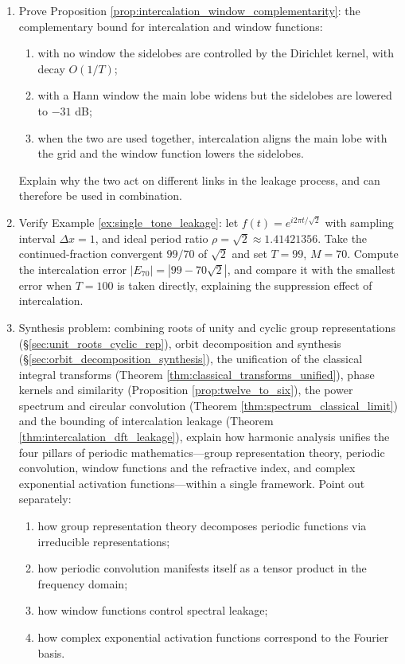 \begin{enumerate}[leftmargin=3em, label=\textbf{Exercise \arabic*}]
    \item Prove Proposition \ref{prop:intercalation_window_complementarity}:
    the complementary bound for intercalation and window functions:
    \begin{enumerate}[label=(\roman*)]
        \item with no window the sidelobes are controlled by the Dirichlet kernel, with decay $O(1/T)$;
        \item with a Hann window the main lobe widens but the sidelobes are lowered to $-31$ dB;
        \item when the two are used together, intercalation aligns the main lobe with the grid and the window function lowers the sidelobes.
    \end{enumerate}
    Explain why the two act on different links in the leakage process,
    and can therefore be used in combination.

    \item Verify Example \ref{ex:single_tone_leakage}:
    let $f(t)=e^{i2\pi t/\sqrt{2}}$ with sampling interval $\Delta x=1$,
    and ideal period ratio $\rho=\sqrt{2}\approx1.41421356$.
    Take the continued-fraction convergent $99/70$ of $\sqrt{2}$ and set $T=99$, $M=70$.
    Compute the intercalation error $|E_{70}|=|99-70\sqrt{2}|$,
    and compare it with the smallest error when $T=100$ is taken directly, explaining the suppression effect of intercalation.

    \item Synthesis problem: combining roots of unity and cyclic group representations (\S\ref{sec:unit_roots_cyclic_rep}),
    orbit decomposition and synthesis (\S\ref{sec:orbit_decomposition_synthesis}),
    the unification of the classical integral transforms (Theorem \ref{thm:classical_transforms_unified}),
    phase kernels and similarity (Proposition \ref{prop:twelve_to_six}),
    the power spectrum and circular convolution (Theorem \ref{thm:spectrum_classical_limit})
    and the bounding of intercalation leakage (Theorem \ref{thm:intercalation_dft_leakage}),
    explain how harmonic analysis unifies the four pillars of periodic mathematics---group representation theory, periodic
    convolution, window functions and the refractive index, and complex exponential activation functions---within a single framework.
    Point out separately:
    \begin{enumerate}[label=(\roman*)]
        \item how group representation theory decomposes periodic functions via irreducible representations;
        \item how periodic convolution manifests itself as a tensor product in the frequency domain;
        \item how window functions control spectral leakage;
        \item how complex exponential activation functions correspond to the Fourier basis.
    \end{enumerate}
\end{enumerate}
